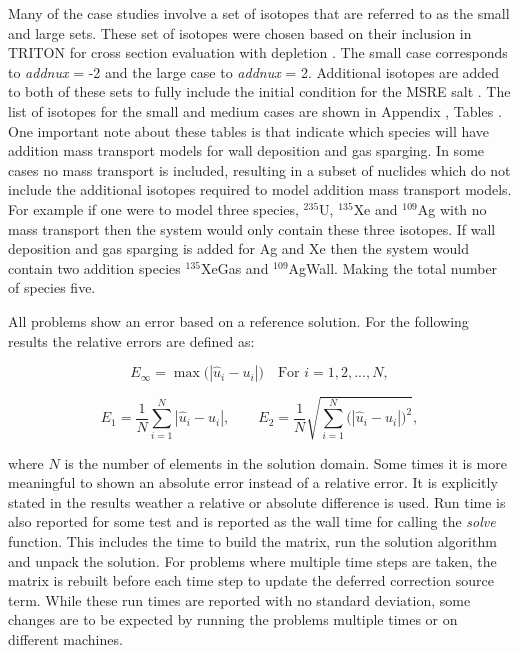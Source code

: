 Many of the case studies involve a set of isotopes that are referred to as the small and large sets. These set of isotopes were chosen based on their inclusion in TRITON for cross section evaluation with depletion \cite{scaleManual}. The small case corresponds to \textit{addnux} = -2 and the large case to \textit{addnux} = 2. Additional isotopes are added to both of these sets to fully include the initial condition for the MSRE salt \cite{MSREbenchmark}. The list of isotopes for the small and medium cases are shown in Appendix , Tables  . One important note about these tables is that indicate which species will have addition mass transport models for wall deposition and gas sparging. In some cases no mass transport is included, resulting in a subset of nuclides which do not include the additional isotopes required to model addition mass transport models. For example if one were to model three species, ${}^{235}$U, ${}^{135}$Xe and ${}^{109}$Ag with no mass transport then the system would only contain these three isotopes. If wall deposition and gas sparging is added for Ag and Xe then the system would contain two addition species ${}^{135}$XeGas and ${}^{109}$AgWall. Making the total number of species five. 

All problems show an error based on a reference solution. For the following results the relative errors are defined as:

\begin{equation*}
    E_{\infty} = \max\bigg(|\hat{u}_{i} - u_{i}|\bigg) \quad \text{For } i = 1, 2, ..., N,
\end{equation*}

\begin{equation*}
    E_{1} = \frac{1}{N}\sum_{i=1}^{N}|\hat{u}_{i} - u_{i}|, \quad \quad E_{2} = \frac{1}{N}\sqrt{\sum_{i=1}^{N}\bigg(|\hat{u}_{i} - u_{i}|\bigg)^{2}},
\end{equation*}

\noindent where $N$ is the number of elements in the solution domain. Some times it is more meaningful to shown an absolute error instead of a relative error. It is explicitly stated in the results weather a relative or absolute difference is used. Run time is also reported for some test and is reported as the wall time for calling the \textit{solve} function. This includes the time to build the matrix, run the solution algorithm and unpack the solution. For problems where multiple time steps are taken, the matrix is rebuilt before each time step to update the deferred correction source term. While these run times are reported with no standard deviation, some changes are to be expected by running the problems multiple times or on different machines. 

